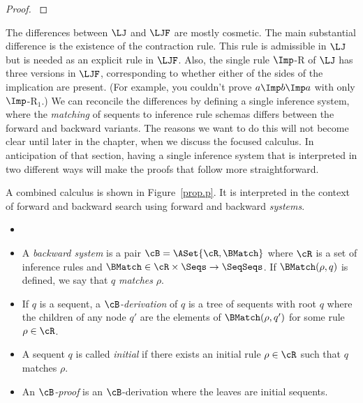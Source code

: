 \begin{proof}
  \cite{Voronkov.2001.Handbook}
\end{proof}

The differences between $\LJ$ and $\LJF$ are mostly cosmetic.  The main
substantial difference is the existence of the contraction rule.
This rule is admissible in $\LJ$ but is needed as an explicit rule in
$\LJF$.  Also, the single rule $\Imp$-R of $\LJ$ has three versions
in $\LJF$, corresponding to whether either of the sides of the implication
are present.  (For example, you couldn't prove $a\Imp b\Imp a$ with only
$\Imp$-R$_1$.)  We can reconcile the differences by defining a single
inference system, where the \emph{matching} of sequents to inference
rule schemas differs between the forward and backward variants.  The
reasons we want to do this will not become clear until later in the
chapter, when we discuss the focused calculus.  In anticipation of
that section, having a single inference system that is interpreted in two
different ways will make the proofs that follow more straightforward.

A combined calculus is shown in Figure~\ref{prop.p}.  It is interpreted
in the context of forward and backward search using forward
and backward \emph{systems}.



\begin{definition}
  \begin{itemize}
  \item[]
  \item A \emph{backward system} is a pair $\cB=\ASet{\cR, \BMatch}$ where
    $\cR$ is a set of inference rules and
    $\BMatch\in\cR\times \Seqs\to\SeqSeqs$.
    If $\BMatch(\rho, q)$ is defined, we say that $q$ \emph{matches}
    $\rho$.
  \item If $q$ is a sequent, a \emph{$\cB$-derivation} of $q$
    is a tree of sequents with root $q$ where the children of
    any node $q'$ are the elements of $\BMatch(\rho, q')$ for some
    rule $\rho\in\cR$.
  \item A sequent $q$ is called \emph{initial} if there exists
    an initial rule $\rho\in\cR$ such that $q$ matches $\rho$.
  \item An \emph{$\cB$-proof} is an $\cB$-derivation
    where the leaves are initial sequents.
  \end{itemize}
\end{definition}

